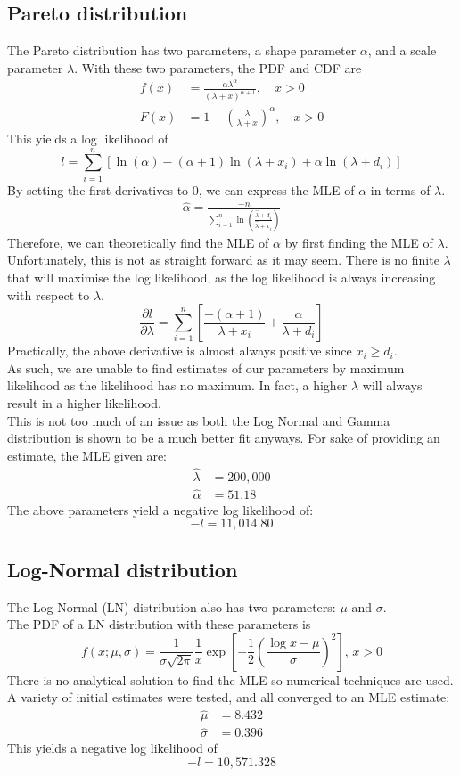 \documentclass[titlepage]{article}
\begin{document}
	\subsection{Pareto distribution}
	The Pareto distribution has two parameters, a shape parameter $ \alpha $, and a scale parameter $ \lambda $. With these two parameters, the PDF and CDF are 
	\begin{align*}
		f(x) &= \frac{\alpha \lambda^\alpha}{(\lambda+x)^{\alpha + 1}}, \quad x > 0\\
		F(x) &= 1-\left(\frac{\lambda}{\lambda + x}\right)^\alpha, \quad x > 0
	\end{align*}
	This yields a log likelihood of
	$$ l=\sum_{i=1}^{n}\left[\ln(\alpha) - (\alpha + 1)\ln(\lambda + x_i) + \alpha\ln(\lambda+d_i)\right]$$
	By setting the first derivatives to 0, we can express the MLE of $\alpha$ in terms of $\lambda$.
	\begin{align}
	\hat{\alpha} = \frac{-n}{\sum_{i=1}^{n}\ln\left(\frac{\hat{\lambda} + d_i}{\hat{\lambda}+x_i}\right)} \label{pareto_dl_da}
	\end{align}
	Therefore, we can theoretically find the MLE of $\alpha$ by first finding the MLE of $\lambda$. Unfortunately, this is not as straight forward as it may seem. There is no finite $\lambda$ that will maximise the log likelihood, as the log likelihood is always increasing with respect to $\lambda$.
	$$\frac{\partial l}{\partial\lambda}=\sum_{i=1}^{n}\left[\frac{-(\alpha+1)}{\lambda+x_i}+\frac{\alpha}{\lambda+d_i}\right]$$
	Practically, the above derivative is almost always positive since $x_i \geq d_i$.\\
	As such, we are unable to find estimates of our parameters by maximum likelihood as the likelihood has no maximum. In fact, a higher $\lambda$ will always result in a higher likelihood.\\
	This is not too much of an issue as both the Log Normal and Gamma distribution is shown to be a much better fit anyways. For sake of providing an estimate, the MLE given are:
	\begin{align*}
		\hat{\lambda} &= 200,000\\
		\hat{\alpha} &= 51.18
	\end{align*}
	The above parameters yield a negative log likelihood of:
	$$-l = 11,014.80$$
	
	
	\subsection{Log-Normal distribution}
	The Log-Normal (LN) distribution also has two parameters: $\mu$ and $ \sigma$.\\
	The PDF of a LN distribution with these parameters is
	$$f(x; \mu, \sigma) = \frac{1}{\sigma \sqrt{2\pi}}\frac{1}{x}\exp\left[-\frac{1}{2}\left(\frac{\log x-\mu}{\sigma}\right)^2\right], \, x>0$$
	There is no analytical solution to find the MLE so numerical techniques are used. A variety of initial estimates were tested, and all converged to an MLE estimate:
	\begin{align*}
		\hat{\mu} &= 8.432\\
		\hat{\sigma} &= 0.396
	\end{align*}
	This yields a negative log likelihood of
	$$ -l = 10,571.328$$
	
\end{document}
